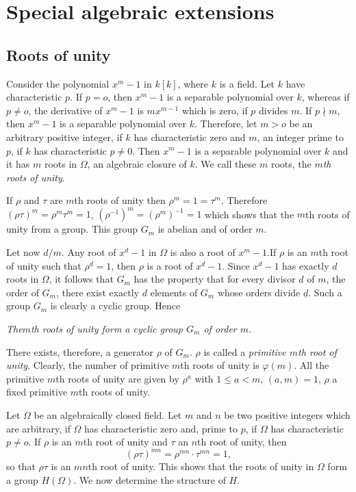 \chapter{Special algebraic extensions}\label{chap6}%

\section{Roots of unity}\label{c6:s1}\pageoriginale %

Consider the polynomial $x^m -1$ in $k [k]$, where $k$ is a
field. Let $k$ have characteristic $p$. If $p=o$, then $x^m -1$ is a
separable polynomial over $k$, whereas if $p \neq o$, the derivative
of $x^m -1$ is $m x^{m-1}$ which is zero, if $p$ divides $m$. If $p
\nmid m$, then $x^m -1$ is a separable polynomial over $k$. Therefore,
let $m > o$ be an arbitrary positive integer, if $k$ has characteristic
zero and $m$, an integer prime to $p$, if $k$ has characteristic $p
\neq 0$. Then $x^m -1$ is a separable polynomial over $k$ and it 
has $m$ roots in $\Omega$, an algebraic closure of $k$. We call these
$m$ roots, the \textit{$m$th roots  of unity}.  

If $\rho$ and $\tau$ are $m$th roots of unity then $\rho^m = 1 =
\tau^m$. Therefore $(\rho \tau)^m = \rho^m \tau^m = 1$, $(\rho^{-1})^m =
(\rho^m)^{-1} = 1$ which shows that the $m$th roots of unity from a
group. This group $G_m$ is abelian and of order $m$.  

Let now $d/m$. Any root of $x^d -1$ in $\Omega$ is also a root of $x^m
-1$.If $\rho$ is an $m$th root of unity such that $\rho^d=1$, then
$\rho$ is  a root of $x^d-1$. Since $x^d-1$ has exactly $d$ roots in
$\Omega$, it follows that $G_m$ has the property that for every
divisor $d$ of $m$, the order of $G_m$, there exist exactly $d$
elements of $G_m$ whose orders divide $\underline{d}$. Such a group
$G_m$ is clearly a cyclic group.  Hence 

\textit{The\pageoriginale $m$th roots  of unity form a cyclic group $
  G_m $ of   order $m$.}  

There exists, therefore, a generator $\rho$ of $ G_m$. $\rho$ is
called a \textit{primitive $m$th root of unity}. Clearly, the number of
primitive $m$th roots of unity is $\varphi(m)$. All the primitive $m$th
roots of unity are given by $\rho ^a$ with $1 \le a < m$, $(a,m) =1$,
$\rho$ a fixed primitive $m$th roots of unity.   

Let $\Omega$ be an algebraically closed field. Let $m$ and $n$ be two
positive integers which are arbitrary, if $\Omega$ has characteristic
zero and, prime to $p$, if $\Omega$ has characteristic $p \neq o$. If
$\rho$ is an $m$th root of unity and $\tau$ an $n$th root of unity,
then  
$$
(\rho \tau)^{mn} = \rho^{mn} \cdot \tau^{mn} =1,
$$
so that $\rho \tau$ is an $mn$th root of unity. This shows that the
roots of unity in $\Omega$ form a group $H(\Omega)$. We now determine
the structure of $H$. 

